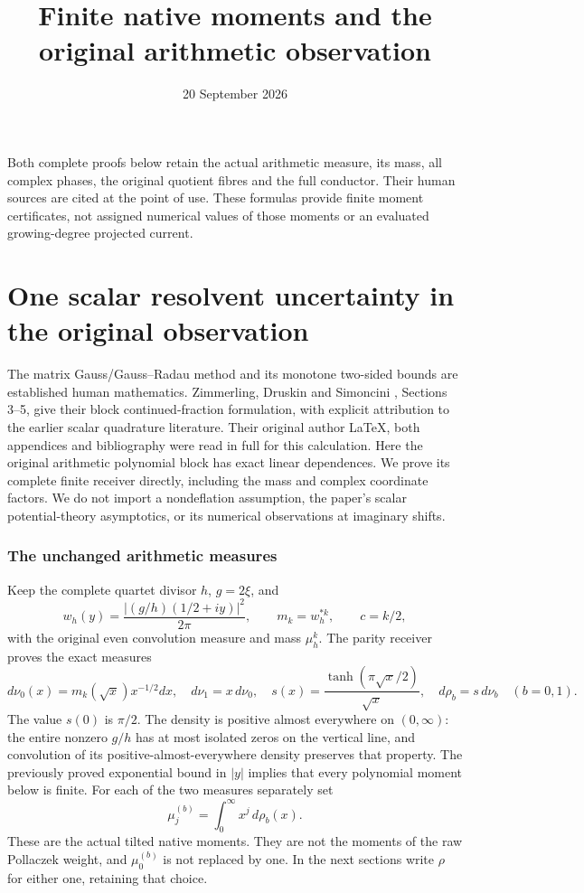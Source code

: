 \documentclass[11pt]{article}
\title{Finite native moments and the original arithmetic observation}
\author{}\date{20 September 2026}
\begin{document}
\maketitle
Both complete proofs below retain the actual arithmetic measure, its mass,
all complex phases, the original quotient fibres and the full conductor.
Their human sources are cited at the point of use. These formulas provide
finite moment certificates, not assigned numerical values of those moments
or an evaluated growing-degree projected current.


\clearpage\begingroup
\part*{One scalar resolvent uncertainty in the original observation}


The matrix Gauss/Gauss--Radau method and its monotone two-sided bounds
are established human mathematics. Zimmerling, Druskin and Simoncini
\cite{rrnative:ZDS}, Sections 3--5, give their block continued-fraction formulation,
with explicit attribution to the earlier scalar quadrature literature.
Their original author LaTeX, both appendices and bibliography were read
in full for this calculation. Here the original arithmetic polynomial
block has exact linear dependences. We prove its complete finite receiver
directly, including the mass and complex coordinate factors. We do not
import a nondeflation assumption, the paper's scalar potential-theory
asymptotics, or its numerical observations at imaginary shifts.

\section{The unchanged arithmetic measures}
Keep the complete quartet divisor $h$, $g=2\xi$, and
\[
 w_h(y)=\frac{|(g/h)(1/2+iy)|^2}{2\pi},\qquad
 m_k=w_h^{*k},\qquad c=k/2,
\]
with the original even convolution measure and mass $\mu_h^k$.
The parity receiver \cite{rrnative:PP} proves the exact measures
\[
 d\nu_0(x)=m_k(\sqrt x)x^{-1/2}dx,\quad d\nu_1=x\,d\nu_0,
 \quad s(x)=\frac{\tanh(\pi\sqrt x/2)}{\sqrt x},\quad
 d\rho_b=s\,d\nu_b\quad(b=0,1).
\]
The value $s(0)$ is $\pi/2$. The density is positive almost everywhere
on $(0,\infty)$: the entire nonzero $g/h$ has at most isolated zeros
on the vertical line, and convolution of its positive-almost-everywhere
density preserves that property. The previously proved exponential
bound in $|y|$ implies that every polynomial moment below is finite.
For each of the two measures separately set
\[
 \mu_j^{(b)}=\int_0^\infty x^j\,d\rho_b(x).
\]
These are the actual tilted native moments. They are not the moments
of the raw Pollaczek weight, and $\mu_0^{(b)}$ is not replaced by one.
In the next sections write $\rho$ for either one, retaining that choice.
\end{document}
